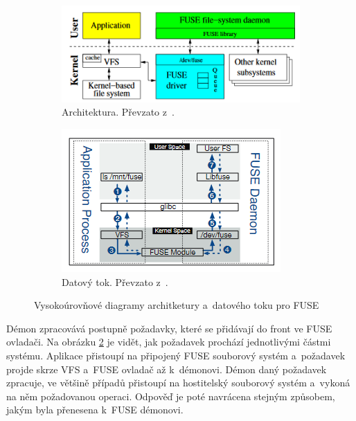 \begin{figure}[h]
    \begin{subfigure}[h]{.45\linewidth}
        \centering
        \includegraphics[width=1 \linewidth]{other-fig/FUSE_architecture.png}
        \caption{Architektura. Převzato z \cite{FuseOrNotToFuse}.}
    \end{subfigure}
    \hfill
    \begin{subfigure}[h]{.45\linewidth}
        \centering
        \includegraphics[width=1 \linewidth]{other-fig/FUSE_dataflow.png}
        \caption{Datový tok. Převzato z \cite{HardeningFUSE}.}
        \label{fig:fuse_dataflow}
    \end{subfigure}
    \caption{Vysokoúrovňové diagramy architketury a datového toku pro FUSE}
\end{figure}

Démon zpracovává postupně požadavky, které se přidávají do front ve FUSE ovladači. Na obrázku \ref{fig:fuse_dataflow} je vidět, jak požadavek prochází jednotlivými částmi
systému. Aplikace přistoupí na připojený FUSE souborový systém a požadavek projde skrze VFS a FUSE ovladač až k démonovi. Démon daný požadavek zpracuje, ve většině případů
přistoupí na hostitelský souborový systém a vykoná na něm požadovanou operaci. Odpověď je poté navrácena stejným způsobem, jakým byla přenesena k FUSE démonovi.

